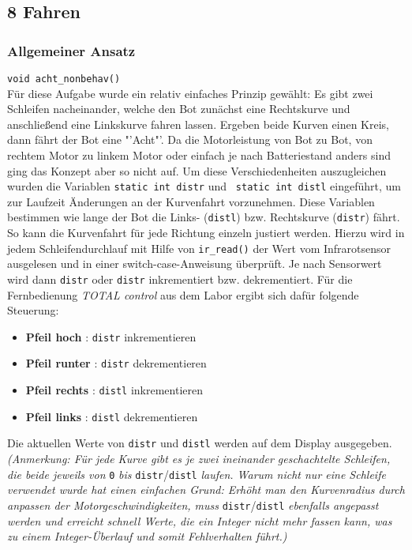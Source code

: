 \subsection{8 Fahren}
\label{8-fahren}

\subsubsection{Allgemeiner Ansatz}

\verb+void acht_nonbehav()+ \\

Für diese Aufgabe wurde ein relativ einfaches Prinzip gewählt: Es gibt zwei Schleifen nacheinander, welche den Bot zunächst eine Rechtskurve und anschließend eine Linkskurve fahren lassen. Ergeben beide Kurven einen Kreis, dann fährt der Bot eine "'Acht"'. Da die Motorleistung von Bot zu Bot, von rechtem Motor zu linkem Motor oder einfach je nach Batteriestand anders sind ging das Konzept aber so nicht auf.
Um diese Verschiedenheiten auszugleichen wurden die Variablen \verb+static int distr+ und \verb+ static int distl+ eingeführt, um zur Laufzeit Änderungen an der Kurvenfahrt vorzunehmen. Diese Variablen bestimmen wie lange der Bot die Links- (\verb+distl+) bzw. Rechtskurve (\verb+distr+) fährt. So kann die Kurvenfahrt für jede Richtung einzeln justiert werden. 
Hierzu wird in jedem Schleifendurchlauf mit Hilfe von \verb+ir_read()+ der Wert vom Infrarotsensor ausgelesen und in einer switch-case-Anweisung überprüft. Je nach Sensorwert wird dann \verb+distr+ oder \verb+distr+ inkrementiert bzw. dekrementiert. Für die Fernbedienung \textit{TOTAL control} aus dem Labor ergibt sich dafür folgende Steuerung:
\begin{itemize}
	\item \textbf{Pfeil hoch}   : \verb_distr_  inkrementieren
	\item \textbf{Pfeil runter} : \verb_distr_  dekrementieren
	\item \textbf{Pfeil rechts} : \verb_distl_  inkrementieren
	\item \textbf{Pfeil links}  : \verb_distl_  dekrementieren
\end{itemize}

\noindent Die aktuellen Werte von \verb+distr+ und \verb+distl+ werden auf dem Display ausgegeben.\\

\textit{(Anmerkung: Für jede Kurve gibt es je zwei ineinander geschachtelte Schleifen, die beide jeweils von }\verb+0+\textit{ bis }\verb+distr+/\verb+distl+\textit{ laufen. Warum nicht nur eine Schleife verwendet wurde hat einen einfachen Grund: Erhöht man den Kurvenradius durch anpassen der Motorgeschwindigkeiten, muss }\verb+distr+/\verb+distl+\textit{ ebenfalls angepasst werden und erreicht schnell Werte, die ein Integer nicht mehr fassen kann, was zu einem Integer-Überlauf und somit Fehlverhalten führt.)}

